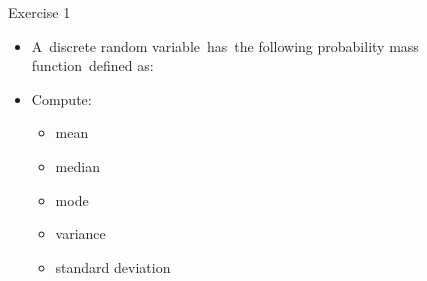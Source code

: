 \documentclass{beamer}
\begin{document}
\begin{frame}
{\centerline{Exercise 1}}
\begin{itemize}
    \item A discrete random variable has the following probability mass function defined as:
    \newline
    \begin{center}

    \end{center}

    \newline
    \item Compute:
    \begin{itemize}
        \item mean
        \item median
        \item mode
        \item variance
        \item standard deviation
    \end{itemize}
\end{itemize}
\end{frame}
\end{document}

